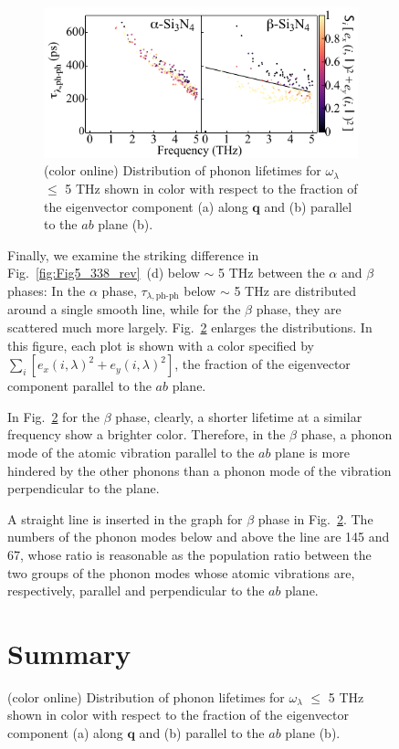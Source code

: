 \documentclass[twocolumn,amsmath,amssymb,a4paper,prb,superscriptaddress,floatfix]{revtex4-1}
\begin{document}
\begin{figure}[h]
\begin{figure}[ht]
	 \centering
	   \includegraphics[width=\linewidth]{figure_analyze_gamma3_m1010_nolog_gray_only_ab.pdf} \caption{(color
		   	  online) Distribution of phonon lifetimes for $\omega_\lambda$ $\leq$ 5 THz
	  		  shown in color with respect to the fraction of the eigenvector
			  component (a) along $\mathbf q$ 
		  	  and (b) parallel to the $ab$ plane (b).} \label{fig:Fig7_338} 
	   \centering
\end{figure}

Finally, we examine the striking difference in Fig.~\ref{fig:Fig5_338_rev}~(d)
below $\sim$ 5 THz between the $\alpha$ and $\beta$ phases: In the $\alpha$
phase, $\tau_{\lambda,\text{ph-ph}}$ below $\sim$ 5 THz are distributed around a single
smooth line, while for the $\beta$ phase, they are scattered much more largely.
Fig.~\ref{fig:Fig7_338} enlarges the distributions.
In this figure, each plot is shown with a color
specified by 
$\sum_{i}[e_x(i,\lambda)^2+e_y(i,\lambda)^2]$, the fraction of the eigenvector
component parallel to the $ab$ plane. 

In Fig.~\ref{fig:Fig7_338} for the $\beta$ phase, clearly, a shorter
lifetime at a similar frequency show a brighter color. 
Therefore, in the $\beta$
phase,  a phonon mode of the atomic vibration parallel to the $ab$ plane is more hindered by
the other phonons than a phonon mode of the vibration 
perpendicular to the plane.

A straight line is inserted in the graph for $\beta$ phase in
Fig.~\ref{fig:Fig7_338}.  The numbers of the phonon modes below and above the
line are 145 and 67, whose ratio is reasonable as the population ratio between
the two groups of the phonon modes whose atomic vibrations are, respectively,
parallel and perpendicular to the $ab$ plane.


\section{Summary}


\end{figure}
\end{document}
